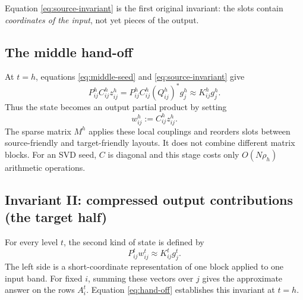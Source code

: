 \documentclass[11pt]{article}
\begin{document}
Equation \eqref{eq:source-invariant} is the first original invariant: the slots contain \emph{coordinates of the input}, not yet pieces of the output.

\subsection{The middle hand-off}

At $t=h$, equations \eqref{eq:middle-seed} and \eqref{eq:source-invariant} give
\[
 P_{ij}^{h}C_{ij}^{h}z_{ij}^{h}
 =P_{ij}^{h}C_{ij}^{h}(Q_{ij}^{h})^*g_j^h
 \approx K_{ij}^{h}g_j^h .
\]
Thus the state becomes an output partial product by setting
\[
 w_{ij}^{h}:=C_{ij}^{h}z_{ij}^{h}.
 \tag{8}\label{eq:hand-off}
\]
The sparse matrix $M^h$ applies these local couplings and reorders slots between source-friendly and target-friendly layouts.  It does not combine different matrix blocks.  For an SVD seed, $C$ is diagonal and this stage costs only $O(N\rho_h)$ arithmetic operations.

\subsection{Invariant II: compressed output contributions (the target half)}

For every level $t$, the second kind of state is defined by
\[
 \boxed{\quad P_{ij}^{t}w_{ij}^{t}\approx K_{ij}^{t}g_j^t. \quad}
 \tag{9}\label{eq:target-invariant}
\]
The left side is a short-coordinate representation of one block applied to one input band.  For fixed $i$, summing these vectors over $j$ gives the approximate answer on the rows $A_i^t$.  Equation \eqref{eq:hand-off} establishes this invariant at $t=h$.
\end{document}
